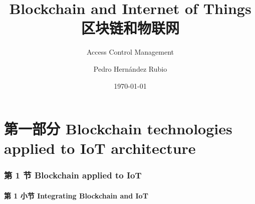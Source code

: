 \documentclass[
    aspectratio=169,                   %
]{beamer}
\begin{document}
    \title{Blockchain and Internet of Things 区块链和物联网}  %
    \subtitle{Access Control Management}         %
    \author{Pedro Hernández Rubio}                  %
    \date{\today}                          %
    \maketitle                             %

\part{第一部分 Blockchain technologies applied to IoT architecture}

\AtBeginSection[]{
    \begin{frame}
        \sectionpage                   %
    \end{frame}
}


\section{第 1 节 Blockchain applied to IoT}

\subsection{第 1 小节 Integrating Blockchain and IoT}
\end{document}

